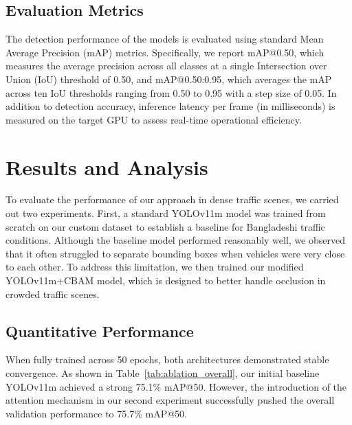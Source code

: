 \documentclass[sigconf]{acmart}
\begin{document}
\subsection{Evaluation Metrics}
The detection performance of the models is evaluated using standard Mean Average Precision (mAP) metrics. Specifically, we report mAP@0.50, which measures the average precision across all classes at a single Intersection over Union (IoU) threshold of 0.50, and mAP@0.50:0.95, which averages the mAP across ten IoU thresholds ranging from 0.50 to 0.95 with a step size of 0.05. In addition to detection accuracy, inference latency per frame (in milliseconds) is measured on the target GPU to assess real-time operational efficiency.


\section{Results and Analysis}
To evaluate the performance of our approach in dense traffic scenes, we carried out two experiments. First, a standard YOLOv11m model was trained from scratch on our custom dataset to establish a baseline for Bangladeshi traffic conditions. Although the baseline model performed reasonably well, we observed that it often struggled to separate bounding boxes when vehicles were very close to each other. To address this limitation, we then trained our modified YOLOv11m+CBAM model, which is designed to better handle occlusion in crowded traffic scenes.

\subsection{Quantitative Performance}
When fully trained across 50 epochs, both architectures demonstrated stable convergence. As shown in Table~\ref{tab:ablation_overall}, our initial baseline YOLOv11m achieved a strong 75.1\% mAP@50. However, the introduction of the attention mechanism in our second experiment successfully pushed the overall validation performance to 75.7\% mAP@50.
\end{document}
